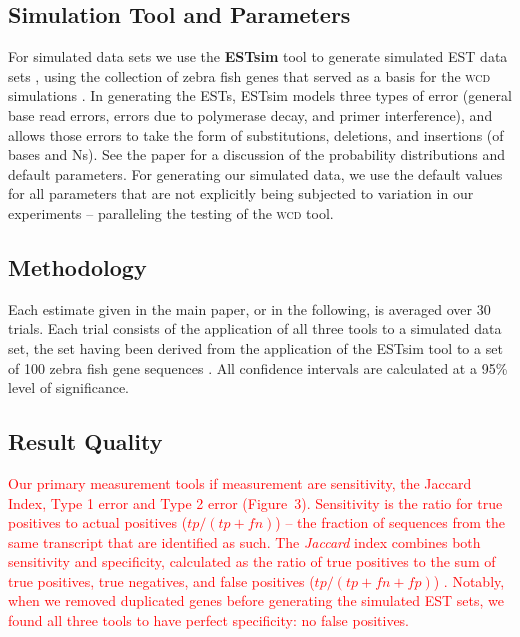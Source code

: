 \documentclass[a4paper,12pt]{article}
\newcommand{\mc}[1]{\textcolor{red}{#1}}
\begin{document}
\begin{appendix}
\subsection{Simulation Tool and Parameters}

For simulated data sets we use the {\bf ESTsim} tool to generate
simulated EST data sets \cite{Hazelhurst03}, using the collection of
zebra fish genes that served as a basis for the \textsc{wcd} simulations
\cite{Hazelhurst08a}.  In generating the ESTs, ESTsim models three
types of error (general base read errors, errors due to
polymerase decay, and primer interference), and allows those errors to
take the form of substitutions, deletions, and insertions (of bases
and Ns).  See the paper for a discussion of the probability
distributions and default parameters.  For generating our simulated
data, we use the default values for all parameters that are not
explicitly being subjected to variation in our experiments --
paralleling the testing of the \textsc{wcd} tool.



\subsection{Methodology} 

Each estimate given in the main paper, or in the following, is
averaged over 30 trials.  Each trial consists of the application of
all three tools to a simulated data set, the set having been derived
from the application of the ESTsim tool to a set of 100 zebra fish
gene sequences \cite{Hazelhurst03}.  All confidence intervals are
calculated at a 95\% level of significance.

\subsection{Result Quality}

\mc{Our primary measurement tools if measurement are sensitivity, the
Jaccard Index, Type 1 error and Type 2 error
(Figure~3).  Sensitivity is the ratio for true
positives to actual positives ($tp / (tp + fn)$) -- the fraction of
sequences from the same transcript that are identified as such.  The
{\it Jaccard} index combines both sensitivity and specificity,
calculated as the ratio of true positives to the sum of true
positives, true negatives, and false positives ($tp / (tp+fn+fp)$)
\cite{Hazelhurst08a}.  Notably, when we removed duplicated genes
before generating the simulated EST sets, we found all three tools to
have perfect specificity: no false positives.}


\end{appendix}
\end{document}
